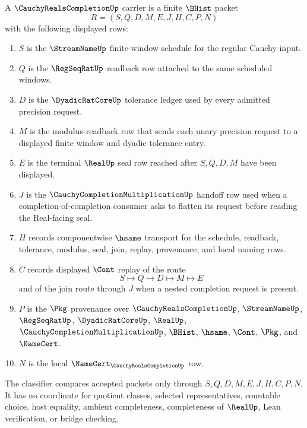 \begin{definition}
\label{def:cauchy-reals-completion-carrier}
A $\CauchyRealsCompletionUp$ carrier is a finite $\BHist$ packet
$$
R=(S,Q,D,M,E,J,H,C,P,N)
$$
with the following displayed rows:
\begin{enumerate}
\item $S$ is the $\StreamNameUp$ finite-window schedule for the regular Cauchy input.
\item $Q$ is the $\RegSeqRatUp$ readback row attached to the same scheduled windows.
\item $D$ is the $\DyadicRatCoreUp$ tolerance ledger used by every admitted precision request.
\item $M$ is the modulus-readback row that sends each unary precision request to a displayed finite window and dyadic tolerance entry.
\item $E$ is the terminal $\RealUp$ seal row reached after $S,Q,D,M$ have been displayed.
\item $J$ is the $\CauchyCompletionMultiplicationUp$ handoff row used when a completion-of-completion consumer asks to flatten its request before reading the Real-facing seal.
\item $H$ records componentwise $\hsame$ transport for the schedule, readback, tolerance, modulus, seal, join, replay, provenance, and local naming rows.
\item $C$ records displayed $\Cont$ replay of the route
$$
S \longmapsto Q \longmapsto D \longmapsto M \longmapsto E
$$
and of the join route through $J$ when a nested completion request is present.
\item $P$ is the $\Pkg$ provenance over $\CauchyRealsCompletionUp$, $\StreamNameUp$, $\RegSeqRatUp$, $\DyadicRatCoreUp$, $\RealUp$, $\CauchyCompletionMultiplicationUp$, $\BHist$, $\hsame$, $\Cont$, $\Pkg$, and $\NameCert$.
\item $N$ is the local $\NameCert_{\CauchyRealsCompletionUp}$ row.
\end{enumerate}
The classifier compares accepted packets only through $S,Q,D,M,E,J,H,C,P,N$. It has no coordinate for quotient classes, selected representatives, countable choice, host equality, ambient completeness, completeness of $\RealUp$, Lean verification, or bridge checking.
\end{definition}

